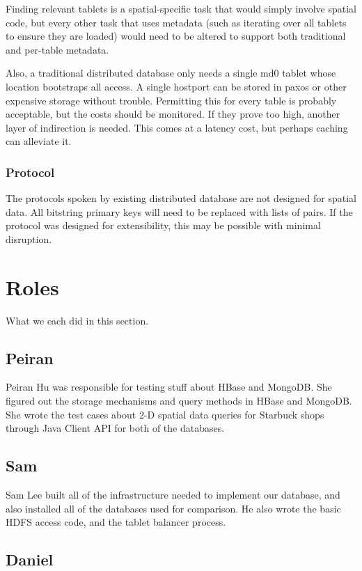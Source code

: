 \documentclass[11pt]{article}
\begin{document}
Finding relevant tablets is a spatial-specific task that would simply involve spatial code, but every other task that uses metadata (such as iterating over all tablets to ensure they are loaded) would need to be altered to support both traditional and per-table metadata.

Also, a traditional distributed database only needs a single md0 tablet whose location bootstraps all access.  A single hostport can be stored in paxos or other expensive storage without trouble.  Permitting this for every table is probably acceptable, but the costs should be monitored.  If they prove too high, another layer of indirection is needed.  This comes at a latency cost, but perhaps caching can alleviate it.

\subsubsection{Protocol}

The protocols spoken by existing distributed database are not designed for spatial data.  All bitstring primary keys will need to be replaced with lists of pairs.  If the protocol was designed for extensibility, this may be possible with minimal disruption.

\section{Roles}
What we each did in this section.
\subsection{Peiran}
Peiran Hu was responsible for testing stuff about HBase and MongoDB. She figured out the storage mechanisms and query methods in HBase and MongoDB. She wrote the test cases about 2-D spatial data queries for Starbuck shops through Java Client API for both of the databases.

\subsection{Sam}
Sam Lee built all of the infrastructure needed to implement our database, and also installed all of the databases used for comparison. He also wrote the basic HDFS access code, and the tablet balancer process.
\subsection{Daniel}
\end{document}
